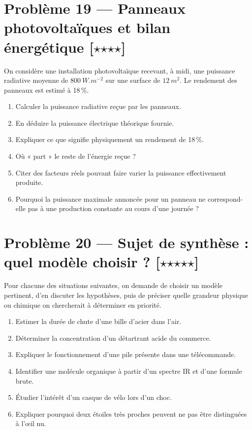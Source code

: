 \documentclass[11pt,a4paper]{article}
\newcommand{\etoile}{\ensuremath{\star}}
\begin{document}
\section*{Problème 19 --- Panneaux photovoltaïques et bilan énergétique \hfill [\etoile\etoile\etoile\etoile]}

On considère une installation photovoltaïque recevant, à midi, une puissance radiative moyenne de $\SI{800}{W.m^{-2}}$ sur une surface de $\SI{12}{m^2}$. Le rendement des panneaux est estimé à 18\,\%.

\begin{enumerate}[label=\arabic*)]
    \item Calculer la puissance radiative reçue par les panneaux.
    \item En déduire la puissance électrique théorique fournie.
    \item Expliquer ce que signifie physiquement un rendement de 18\,\%.
    \item Où « part » le reste de l'énergie reçue ?
    \item Citer des facteurs réels pouvant faire varier la puissance effectivement produite.
    \item Pourquoi la puissance maximale annoncée pour un panneau ne correspond-elle pas à une production constante au cours d'une journée ?
\end{enumerate}

\section*{Problème 20 --- Sujet de synthèse : quel modèle choisir ? \hfill [\etoile\etoile\etoile\etoile\etoile]}

Pour chacune des situations suivantes, on demande de choisir un modèle pertinent, d'en discuter les hypothèses, puis de préciser quelle grandeur physique ou chimique on chercherait à déterminer en priorité.

\begin{enumerate}[label=\alph*)]
    \item Estimer la durée de chute d'une bille d'acier dans l'air.
    \item Déterminer la concentration d'un détartrant acide du commerce.
    \item Expliquer le fonctionnement d'une pile présente dans une télécommande.
    \item Identifier une molécule organique à partir d'un spectre IR et d'une formule brute.
    \item Étudier l'intérêt d'un casque de vélo lors d'un choc.
    \item Expliquer pourquoi deux étoiles très proches peuvent ne pas être distinguées à l'œil nu.
\end{enumerate}
\end{document}
